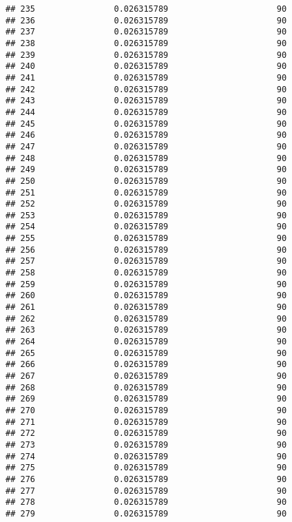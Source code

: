 \documentclass[]{article}
\begin{document}
\begin{verbatim}
## 235                0.026315789                      90
## 236                0.026315789                      90
## 237                0.026315789                      90
## 238                0.026315789                      90
## 239                0.026315789                      90
## 240                0.026315789                      90
## 241                0.026315789                      90
## 242                0.026315789                      90
## 243                0.026315789                      90
## 244                0.026315789                      90
## 245                0.026315789                      90
## 246                0.026315789                      90
## 247                0.026315789                      90
## 248                0.026315789                      90
## 249                0.026315789                      90
## 250                0.026315789                      90
## 251                0.026315789                      90
## 252                0.026315789                      90
## 253                0.026315789                      90
## 254                0.026315789                      90
## 255                0.026315789                      90
## 256                0.026315789                      90
## 257                0.026315789                      90
## 258                0.026315789                      90
## 259                0.026315789                      90
## 260                0.026315789                      90
## 261                0.026315789                      90
## 262                0.026315789                      90
## 263                0.026315789                      90
## 264                0.026315789                      90
## 265                0.026315789                      90
## 266                0.026315789                      90
## 267                0.026315789                      90
## 268                0.026315789                      90
## 269                0.026315789                      90
## 270                0.026315789                      90
## 271                0.026315789                      90
## 272                0.026315789                      90
## 273                0.026315789                      90
## 274                0.026315789                      90
## 275                0.026315789                      90
## 276                0.026315789                      90
## 277                0.026315789                      90
## 278                0.026315789                      90
## 279                0.026315789                      90

\end{verbatim}
\end{document}
